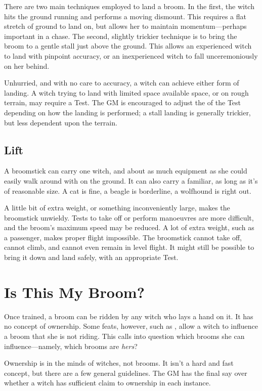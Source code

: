 There are two main techniques employed to land a broom.
In the first, the witch hits the ground running and performs a moving dismount.
This requires a flat stretch of ground to land on, but allows her to maintain momentum---perhaps important in a chase.
The second, slightly trickier technique is to bring the broom to a gentle stall just above the ground.
This allows an experienced witch to land with pinpoint accuracy, or an inexperienced witch to fall unceremoniously on her behind.

Unhurried, and with no care to accuracy, a witch can achieve either form of landing.
A witch trying to land with limited space available space, or on rough terrain, may require a Test.
The GM is encouraged to adjust the {\tn} of the Test depending on how the landing is performed; a stall landing is generally trickier, but less dependent upon the terrain.

\subsection{Lift}

A broomstick can carry one witch, and about as much equipment as she could easily walk around with on the ground.
It can also carry a familiar, as long as it's of reasonable size.
A cat is fine, a beagle is borderline, a wolfhound is right out.

A little bit of extra weight, or something inconveniently large, makes the broomstick unwieldy.
Tests to take off or perform manoeuvres are more difficult, and the broom's maximum speed may be reduced.
A lot of extra weight, such as a passenger, makes proper flight impossible.
The broomstick cannot take off, cannot climb, and cannot even remain in level flight.
It might still be possible to bring it down and land safely, with an appropriate Test.



\section{Is This My Broom?}

Once trained, a broom can be ridden by any witch who lays a hand on it.
It has no concept of ownership.
Some feats, however, such as , allow a witch to influence a broom that she is not riding.
This calls into question which brooms she can influence---namely, which brooms are \emph{hers}?

Ownership is in the minds of witches, not brooms.
It isn't a hard and fast concept, but there are a few general guidelines.
The GM has the final say over whether a witch has sufficient claim to ownership in each instance.

